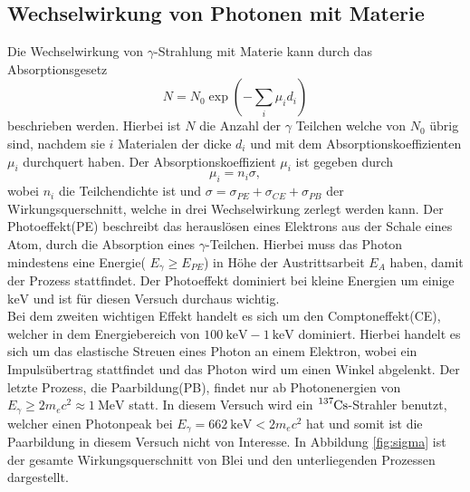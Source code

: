 \subsection{Wechselwirkung von Photonen mit Materie}
Die Wechselwirkung von $\gamma$-Strahlung mit Materie kann durch das Absorptionsgesetz 
\begin{equation}
    \label{eqn:Absorb}
    N = N_0 \exp(-\sum_i \mu_i d_i )
\end{equation}
beschrieben werden.
Hierbei ist $N$ die Anzahl der $\gamma$ Teilchen welche von $N_0$ übrig sind, nachdem sie $i$ Materialen der dicke $d_i$ und mit dem Absorptionskoeffizienten $\mu_i$ durchquert haben.
Der Absorptionskoeffizient $\mu_i$ ist gegeben durch
\begin{equation}
    \mu_i = n_i \sigma,
\end{equation}
wobei $n_i$ die Teilchendichte ist und $\sigma = \sigma_{PE} + \sigma_{CE} + \sigma_{PB}$ der Wirkungsquerschnitt, welche in drei Wechselwirkung zerlegt werden kann.
Der Photoeffekt(PE) beschreibt das herauslösen eines Elektrons aus der Schale eines Atom, durch die Absorption eines $\gamma$-Teilchen. Hierbei muss das Photon mindestens eine Energie( $E_{\gamma} \geq E_{PE}$) in Höhe der Austrittsarbeit $E_{A}$ haben, damit der Prozess stattfindet.
Der Photoeffekt dominiert bei kleine Energien um einige $\si{\keV}$ und ist für diesen Versuch durchaus wichtig.\\
Bei dem zweiten wichtigen Effekt handelt es sich um den Comptoneffekt(CE), welcher in dem Energiebereich von $\SI{100}{\keV}- \SI{1}{\keV}$ dominiert.
Hierbei handelt es sich um das elastische Streuen eines Photon an einem Elektron, wobei ein Impulsübertrag stattfindet und das Photon wird um einen Winkel abgelenkt.
Der letzte Prozess, die Paarbildung(PB), findet nur ab Photonenergien von $E_{\gamma} \geq 2 m_e c^2 \approx \SI{1}{\MeV}$ statt.
In diesem Versuch wird ein $\ce{^{137}Cs}$-Strahler benutzt, welcher einen Photonpeak bei $E_{\gamma} = \SI{662}{\keV} < 2 m_e c^2$ hat und somit ist die Paarbildung in diesem Versuch nicht von Interesse.
In Abbildung \ref{fig:sigma} ist der gesamte Wirkungsquerschnitt von Blei und den unterliegenden Prozessen dargestellt.
